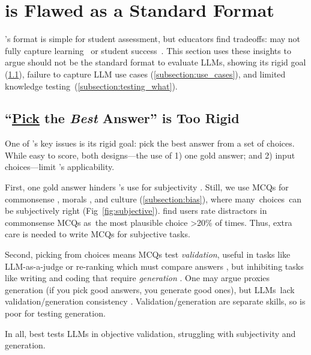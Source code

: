 \section{\mcqa is Flawed as a Standard Format} \label{section:format}

\mcqa's format is simple for student assessment, but educators find
tradeoffs: \mcqa may not fully capture learning~\cite{simkin2005multiple} or student success~\cite{moneta2017limitations}.
%
This section uses these insights to argue \mcqa should not be the standard format to evaluate LLMs, showing its rigid goal
(\cref{subsection:best_answer}), failure to capture LLM use
cases (\cref{subsection:use_cases}), and limited knowledge testing~(\cref{subsection:testing_what}).



\subsection{``\underline{Pick} the \textit{Best} Answer'' is Too Rigid} \label{subsection:best_answer}

One of \mcqa's key issues is its rigid goal: pick the best answer from a set of choices.
While easy to score, both designs---the use of
1) one gold answer; and 2) input choices---limit \mcqa's applicability.

First, one gold answer hinders \mcqa's use for subjectivity
\cite{finetti1965methods}.
Still, we use MCQs for commonsense \cite{bisk2020piqa}, morals \cite{yu-etal-2024-cmoraleval}, and culture (\cref{subsection:bias}), where many~choices~can be subjectively right (Fig~\ref{fig:subjective}).
\citet{Palta2024PlausiblyPQ} find users rate distractors in commonsense MCQs as~the most plausible choice >20\% of times.
Thus, extra care is needed to write MCQs for subjective tasks.

Second, picking from choices means MCQs test \textit{validation}, useful in tasks
like LLM-as-a-judge or re-ranking which must compare answers
\cite{gu2024survey}, but inhibiting tasks like writing and coding that
require \textit{generation} \cite{celikyilmaz2020evaluation}.
%
One may argue \mcqa proxies generation (if you pick good answers, you generate good ones), but LLMs~lack validation/generation consistency
\cite{li2024benchmarking, west2023generative}.
%
Validation/generation are separate skills, so \mcqa is poor for
testing generation.

In all, \mcqa best tests LLMs in objective validation, struggling with subjectivity and generation.

